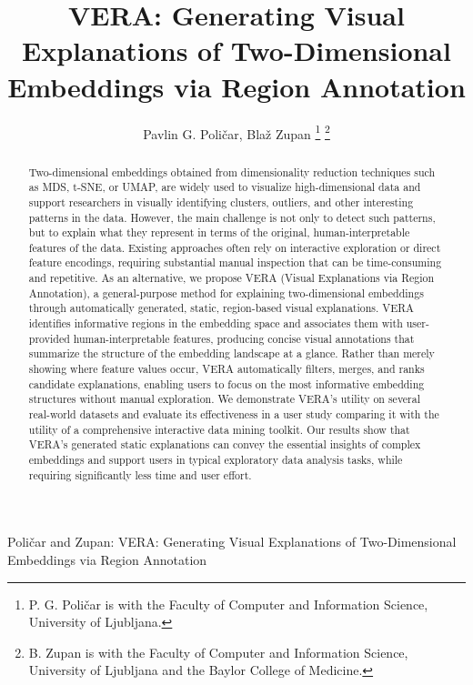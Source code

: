 \documentclass[lettersize,journal]{IEEEtran}
\begin{document}
\title{VERA: Generating Visual Explanations of Two-Dimensional Embeddings via Region Annotation}

\author{Pavlin G. Poli\v{c}ar, Bla\v{z} Zupan
\thanks{P. G. Poli\v{c}ar is with the Faculty of Computer and Information Science, University of Ljubljana.}%
\thanks{B. Zupan is with the Faculty of Computer and Information Science, University of Ljubljana and the Baylor College of Medicine.}}

\markboth{}%
{Poli\v{c}ar and Zupan: VERA: Generating Visual Explanations of Two-Dimensional Embeddings via Region Annotation}

\IEEEpubid{}

\maketitle

\begin{abstract}
Two-dimensional embeddings obtained from dimensionality reduction techniques such as MDS, t-SNE, or UMAP, are widely used to visualize high-dimensional data and support researchers in visually identifying clusters, outliers, and other interesting patterns in the data. However, the main challenge is not only to detect such patterns, but to explain what they represent in terms of the original, human-interpretable features of the data. Existing approaches often rely on interactive exploration or direct feature encodings, requiring substantial manual inspection that can be time-consuming and repetitive.
As an alternative, we propose VERA (Visual Explanations via Region Annotation), a general-purpose method for explaining two-dimensional embeddings through automatically generated, static, region-based visual explanations.
VERA identifies informative regions in the embedding space and associates them with user-provided human-interpretable features, producing concise visual annotations that summarize the structure of the embedding landscape at a glance. Rather than merely showing where feature values occur, VERA automatically filters, merges, and ranks candidate explanations, enabling users to focus on the most informative embedding structures without manual exploration.
We demonstrate VERA's utility on several real-world datasets and evaluate its effectiveness in a user study comparing it with the utility of a comprehensive interactive data mining toolkit.
Our results show that VERA's generated static explanations can convey the essential insights of complex embeddings and support users in typical exploratory data analysis tasks, while requiring significantly less time and user effort.
\end{abstract}
\end{document}
